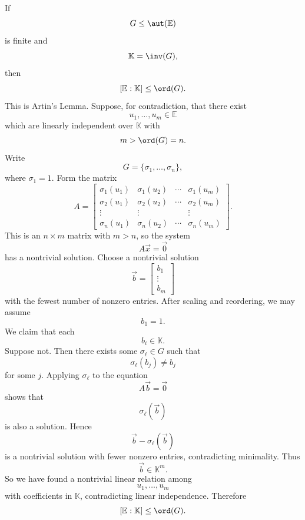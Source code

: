 \begin{theorem}{
    If
    \[
        G\leq \aut(\mathbb{E})
    \]
    is finite and
    \[
        \mathbb{K}=\inv(G),
    \]
    then
    \[
        [\mathbb{E}:\mathbb{K}]\leq \ord(G).
    \]
}
    This is Artin's Lemma.
    Suppose, for contradiction, that there exist
    \[
        u_1,\ldots,u_m\in \mathbb{E}
    \]
    which are linearly independent over $\mathbb{K}$ with
    \[
        m>\ord(G)=n.
    \]
    Write
    \[
        G=\{\sigma_1,\ldots,\sigma_n\},
    \]
    where $\sigma_1=1$.
    Form the matrix
    \[
        A=
        \begin{bmatrix}
            \sigma_1(u_1) & \sigma_1(u_2) & \cdots & \sigma_1(u_m)\\
            \sigma_2(u_1) & \sigma_2(u_2) & \cdots & \sigma_2(u_m)\\
            \vdots & \vdots & & \vdots\\
            \sigma_n(u_1) & \sigma_n(u_2) & \cdots & \sigma_n(u_m)
        \end{bmatrix}.
    \]
    This is an $n\times m$ matrix with $m>n$, so the system
    \[
        A\vec{x}=\vec{0}
    \]
    has a nontrivial solution.
    Choose a nontrivial solution
    \[
        \vec{b}=
        \begin{bmatrix}
            b_1\\
            \vdots\\
            b_m
        \end{bmatrix}
    \]
    with the fewest number of nonzero entries.
    After scaling and reordering, we may assume
    \[
        b_1=1.
    \]
    We claim that each
    \[
        b_i\in \mathbb{K}.
    \]
    Suppose not.
    Then there exists some $\sigma_\ell\in G$ such that
    \[
        \sigma_\ell(b_j)\neq b_j
    \]
    for some $j$.
    Applying $\sigma_\ell$ to the equation
    \[
        A\vec{b}=\vec{0}
    \]
    shows that
    \[
        \sigma_\ell(\vec{b})
    \]
    is also a solution.
    Hence
    \[
        \vec{b}-\sigma_\ell(\vec{b})
    \]
    is a nontrivial solution with fewer nonzero entries, contradicting minimality.
    Thus
    \[
        \vec{b}\in \mathbb{K}^m.
    \]
    So we have found a nontrivial linear relation among
    \[
        u_1,\ldots,u_m
    \]
    with coefficients in $\mathbb{K}$, contradicting linear independence.
    Therefore
    \[
        [\mathbb{E}:\mathbb{K}]\leq \ord(G).
    \]
\end{theorem}

